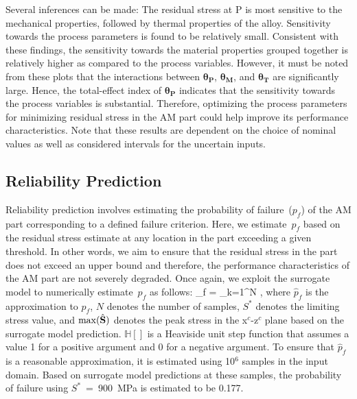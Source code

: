 %
Several inferences can be made: The residual stress at P is most sensitive to the mechanical properties, followed 
by thermal properties of the alloy. Sensitivity towards the process parameters is found to be relatively small. 
Consistent with these findings, the sensitivity towards the material properties grouped together is relatively
higher as compared to the process variables. 
However, it must be noted from these plots that the interactions between $\bm{\theta_P}$, $\bm{\theta_M}$, and $\bm{\theta_T}$
are significantly large. Hence, the total-effect index of $\bm{\theta_P}$ indicates that the sensitivity towards the 
process variables is substantial. Therefore, optimizing the process parameters for minimizing residual
stress in the AM part could help improve its performance characteristics. 
Note that these results are dependent on the choice of nominal values as well as considered intervals
for the uncertain inputs. 

\subsection{Reliability Prediction}
\label{sub:reliability}

Reliability prediction involves estimating the probability of failure~($p_f$) of the AM part
corresponding to a defined failure criterion. Here, we estimate~$p_f$ based on the residual 
stress estimate at any location in
the part exceeding a given threshold. In other words, we aim to ensure that the residual stress
in the part does not exceed an upper bound and therefore, the performance characteristics of
the AM part are not severely degraded. Once again, we exploit the surrogate model to
numerically estimate~$p_f$ as follows:
%
\be
{}_f = \sum\limits_{k=1}^{N} ,
\ee
\label{eq:pf}
%
where $\hat{p}_f$ is the approximation to $p_f$, $N$ denotes the number of samples, $S^\ast$
denotes the limiting stress value, and $\max(\hat{\mathbf{{S}}})$ denotes the peak stress in the
x$^c$-z$^c$ plane based on the surrogate model prediction. $\mathbb{H}[]$
is a Heaviside unit step function that assumes a value 1 for a positive argument and 0 for
a negative argument.
To ensure that $\hat{p}_f$ is a reasonable approximation, it is estimated
using 10$^6$ samples in the input domain. Based on surrogate model predictions at these samples,
the probability of failure using $S^\ast$~=~900~MPa is estimated to be 0.177. 
